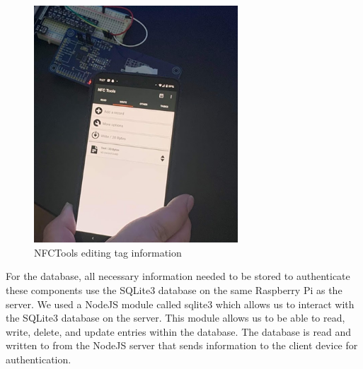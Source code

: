 \begin{figure}[H]
    \centering
    \includegraphics[width=3in]{figures/nfctools.png}
    \caption{NFCTools editing tag information}
\end{figure}

For the database, all necessary information needed to be stored to authenticate these components use the SQLite3 database on the same Raspberry Pi as the server. We used a NodeJS module called sqlite3 which allows us to interact with the SQLite3 database on the server. This module allows us to be able to read, write, delete, and update entries within the database. The database is read and written to from the NodeJS server that sends information to the client device for authentication. 

